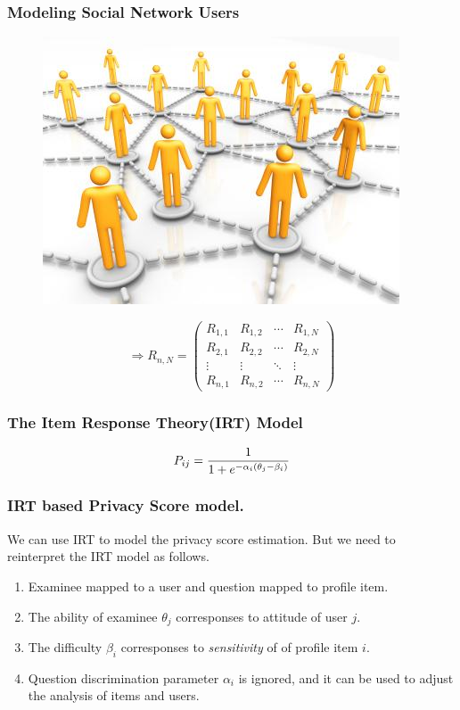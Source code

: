 \documentclass{beamer}
\begin{document}
\begin{frame}[fragile]
  \frametitle{Modeling Social Network Users}

  \begin{figure}
    \begin{center}
      \includegraphics[scale=1.5]{socialnetwork}
    \end{center}
  \end{figure}

\[
\Longrightarrow
 R_{n,N} =
 \begin{pmatrix}
  R_{1,1} & R_{1,2} & \cdots & R_{1,N} \\
  R_{2,1} & R_{2,2} & \cdots & R_{2,N} \\
  \vdots  & \vdots  & \ddots & \vdots  \\
  R_{n,1} & R_{n,2} & \cdots & R_{n,N}
 \end{pmatrix}
\]

\end{frame}

\begin{frame}[fragile]
  \frametitle{The Item Response Theory(IRT) Model}
  \[\LARGE{P_{ij}=\frac{1}{1+e^{-\alpha_i(\theta_j-\beta_i)}}}\]
\end{frame}

\begin{frame}
  \frametitle{IRT based Privacy Score model.}
  We can use IRT to model the privacy score estimation. But we need to
  reinterpret the IRT model as follows. \\ 
  \begin{enumerate}
    \item Examinee mapped to a user and question mapped to profile
      item. 
    \item The ability of examinee $\theta_j$ corresponses to attitude of
      user $j$. 
    \item The difficulty $\beta_i$ corresponses to
      \textit{sensitivity} of of profile item $i$. 
    \item Question discrimination parameter $\alpha_i$ is ignored, and
      it can be used to adjust the analysis of items and users. 
  \end{enumerate}
\end{frame}
\end{document}
